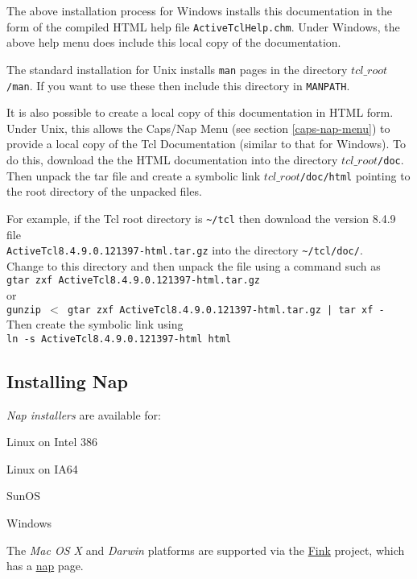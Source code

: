   The above installation process for Windows installs this
  documentation in the form of the compiled HTML help file 
  \texttt{ActiveTclHelp.chm}. Under Windows, the above help menu
  does include this local copy of the documentation.
  
 The standard installation for Unix installs 
  \texttt{man} pages in the directory 
  $tcl\_root$\texttt{/man}. If you want to use these then include this
  directory in 
  \texttt{MANPATH}.
  
 It is also possible to create a local copy of this documentation
  in HTML form.
Under Unix, this allows the Caps/Nap Menu
  (see section \ref{caps-nap-menu})
 to provide a local
  copy of the Tcl Documentation (similar to that for Windows). To do
  this, download the the HTML documentation into the directory 
  $tcl\_root$\texttt{/doc}. Then unpack the tar file and create a symbolic
  link 
  $tcl\_root$\texttt{/doc/html} pointing to the root directory of the unpacked
  files.
  
 For example, if the Tcl root directory is 
  \verb!~/tcl! then download the version 8.4.9 file 
  \\
  \texttt{ActiveTcl8.4.9.0.121397-html.tar.gz} into the directory 
  \verb!~/tcl/doc/!.
  \\
Change to this directory and then unpack the file using a command such as
  \\
  \texttt{gtar zxf ActiveTcl8.4.9.0.121397-html.tar.gz}
  \\or
  \\
  \texttt{gunzip $<$ gtar zxf ActiveTcl8.4.9.0.121397-html.tar.gz | tar xf -}
  \\Then create the symbolic link using
  \\
  \texttt{ln -s ActiveTcl8.4.9.0.121397-html html}

\subsection{Installing Nap}
    \label{install-Installing-nap}

  \emph{Nap installers} are available for:
\begin{bullets}
    \item Linux on Intel 386
    \item Linux on IA64
    \item SunOS
    \item Windows
\end{bullets}
  
 The 
  \emph{Mac OS X} and 
  \emph{Darwin} platforms are supported via the 
  \href{http://fink.sourceforge.net}{Fink} project, which has a 
  \href{http://fink.sourceforge.net/pdb/package.php/nap}{nap}
  page.
  
